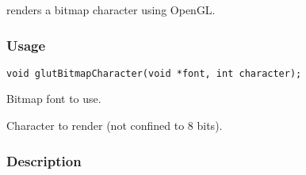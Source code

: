  renders a bitmap character using OpenGL.

\subsubsection*{Usage}
\begin{verbatim}
void glutBitmapCharacter(void *font, int character);
\end{verbatim}
\begin{description}
\itemsep 0in
\item[{\tt font}]
Bitmap font to use.
\item[{\tt character}]
Character to render (not confined to 8 bits).
\end{description}

\subsubsection*{Description}

